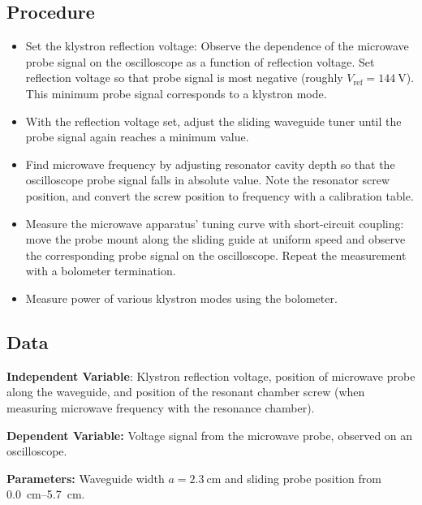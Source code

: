 \documentclass[11pt, a4paper]{article}
\begin{document}
\subsection{Procedure}
\begin{itemize}
	\item Set the klystron reflection voltage: Observe the dependence of the microwave probe signal on the oscilloscope as a function of reflection voltage. Set reflection voltage so that probe signal is most negative (roughly $ V_{\text{ref}} = \SI{144}{\volt} $). This minimum probe signal corresponds to a klystron mode.
	
	\item With the reflection voltage set, adjust the sliding waveguide tuner until the probe signal again reaches a minimum value.
	
	\item Find microwave frequency by adjusting resonator cavity depth so that the oscilloscope probe signal falls in absolute value. Note the resonator screw position, and convert the screw position to frequency with a calibration table.
	
	\item Measure the microwave apparatus' tuning curve with short-circuit coupling: move the probe mount along the sliding guide at uniform speed and observe the corresponding probe signal on the oscilloscope. Repeat the measurement with a bolometer termination.
	
	\item Measure power of various klystron modes using the bolometer.
	
\end{itemize}

\subsection{Data}
\textbf{Independent Variable}: Klystron reflection voltage, position of microwave probe along the waveguide, and position of the resonant chamber screw (when measuring microwave frequency with the resonance chamber).

\vspace{2mm}
\textbf{Dependent Variable:} Voltage signal from the microwave probe, observed on an oscilloscope.

\vspace{2mm}
\textbf{Parameters:} Waveguide width $ a = \SI{2.3}{\centi \meter} $ and sliding probe position from \SIrange{0.0}{5.7}{\centi \meter}.
\end{document}
